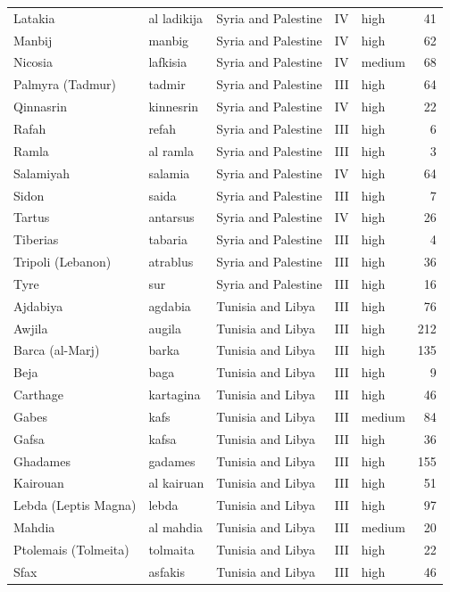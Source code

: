 \documentclass[11pt,a4paper]{article}
\begin{document}
{\begin{longtable}{p{4.6cm}p{3.0cm}p{3.6cm}llr}
Latakia & al ladikija & Syria and Palestine & IV & high & 41\\
Manbij & manbig & Syria and Palestine & IV & high & 62\\
Nicosia & lafkisia & Syria and Palestine & IV & medium & 68\\
Palmyra (Tadmur) & tadmir & Syria and Palestine & III & high & 64\\
Qinnasrin & kinnesrin & Syria and Palestine & IV & high & 22\\
Rafah & refah & Syria and Palestine & III & high & 6\\
Ramla & al ramla & Syria and Palestine & III & high & 3\\
Salamiyah & salamia & Syria and Palestine & IV & high & 64\\
Sidon & saida & Syria and Palestine & III & high & 7\\
Tartus & antarsus & Syria and Palestine & IV & high & 26\\
Tiberias & tabaria & Syria and Palestine & III & high & 4\\
Tripoli (Lebanon) & atrablus & Syria and Palestine & III & high & 36\\
Tyre & sur & Syria and Palestine & III & high & 16\\
Ajdabiya & agdabia & Tunisia and Libya & III & high & 76\\
Awjila & augila & Tunisia and Libya & III & high & 212\\
Barca (al-Marj) & barka & Tunisia and Libya & III & high & 135\\
Beja & baga & Tunisia and Libya & III & high & 9\\
Carthage & kartagina & Tunisia and Libya & III & high & 46\\
Gabes & kafs & Tunisia and Libya & III & medium & 84\\
Gafsa & kafsa & Tunisia and Libya & III & high & 36\\
Ghadames & gadames & Tunisia and Libya & III & high & 155\\
Kairouan & al kairuan & Tunisia and Libya & III & high & 51\\
Lebda (Leptis Magna) & lebda & Tunisia and Libya & III & high & 97\\
Mahdia & al mahdia & Tunisia and Libya & III & medium & 20\\
Ptolemais (Tolmeita) & tolmaita & Tunisia and Libya & III & high & 22\\
Sfax & asfakis & Tunisia and Libya & III & high & 46\\

\end{longtable}}
\end{document}
